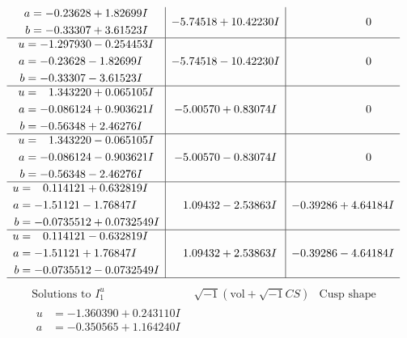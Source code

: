 \documentclass[1p]{elsarticle_modified}
\theoremstyle{definition}
\newcommand{\I}{\sqrt{-1}}
\begin{document}
$$\begin{array}{c|c|c}
\begin{aligned}
a &= -0.23628 + 1.82699 I \\
b &= -0.33307 + 3.61523 I\end{aligned}
 & -5.74518 + 10.42230 I & \phantom{-0.000000 } 0 \\ \hline\begin{aligned}
u &= -1.297930 - 0.254453 I \\
a &= -0.23628 - 1.82699 I \\
b &= -0.33307 - 3.61523 I\end{aligned}
 & -5.74518 - 10.42230 I & \phantom{-0.000000 } 0 \\ \hline\begin{aligned}
u &= \phantom{-}1.343220 + 0.065105 I \\
a &= -0.086124 + 0.903621 I \\
b &= -0.56348 + 2.46276 I\end{aligned}
 & -5.00570 + 0.83074 I & \phantom{-0.000000 } 0 \\ \hline\begin{aligned}
u &= \phantom{-}1.343220 - 0.065105 I \\
a &= -0.086124 - 0.903621 I \\
b &= -0.56348 - 2.46276 I\end{aligned}
 & -5.00570 - 0.83074 I & \phantom{-0.000000 } 0 \\ \hline\begin{aligned}
u &= \phantom{-}0.114121 + 0.632819 I \\
a &= -1.51121 - 1.76847 I \\
b &= -0.0735512 + 0.0732549 I\end{aligned}
 & \phantom{-}1.09432 - 2.53863 I & -0.39286 + 4.64184 I \\ \hline\begin{aligned}
u &= \phantom{-}0.114121 - 0.632819 I \\
a &= -1.51121 + 1.76847 I \\
b &= -0.0735512 - 0.0732549 I\end{aligned}
 & \phantom{-}1.09432 + 2.53863 I & -0.39286 - 4.64184 I\\
 \hline 
 \end{array}$$\newpage$$\begin{array}{c|c|c}  
\text{Solutions to }I^u_{1}& \I (\text{vol} + \sqrt{-1}CS) & \text{Cusp shape}\\
 \hline 
\begin{aligned}
u &= -1.360390 + 0.243110 I \\
a &= -0.350565 + 1.164240 I \\

\end{aligned}
\end{array}$$
\end{document}
